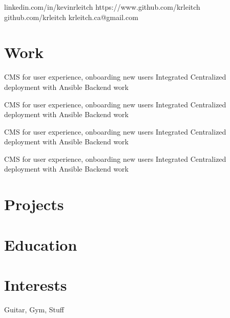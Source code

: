\documentclass{my_resume}
\begin{document}
        {linkedin.com/in/kevinrleitch}
        {https://www.github.com/krleitch}
        {github.com/krleitch}
        {krleitch.ca@gmail.com}

\section{Work}

\workitems
{CMS for user experience, onboarding new users}
{Integrated Centralized deployment with Ansible}
{Backend work}

\workitems
{CMS for user experience, onboarding new users}
{Integrated Centralized deployment with Ansible}
{Backend work}

\workitems
{CMS for user experience, onboarding new users}
{Integrated Centralized deployment with Ansible}
{Backend work}

\workitems
{CMS for user experience, onboarding new users}
{Integrated Centralized deployment with Ansible}
{Backend work}

\section{Projects}

\section{Education}

\section{Interests}
Guitar, Gym, Stuff
\end{document}
